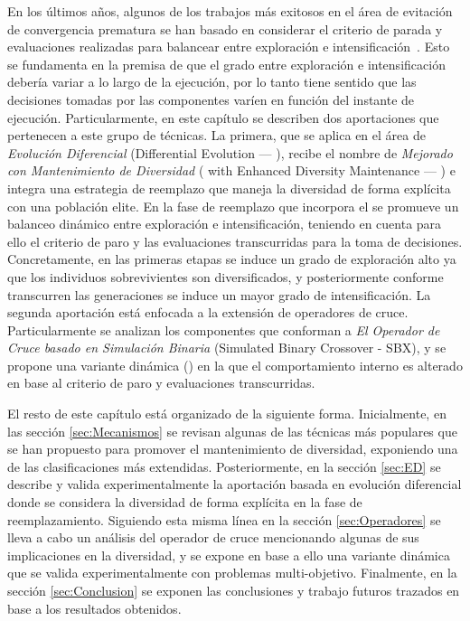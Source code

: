 En los últimos años, algunos de los trabajos más exitosos en el área de evitación de convergencia prematura se han basado en considerar el criterio de parada y evaluaciones
realizadas para balancear entre exploración e intensificación~\cite{segura2016novel}.
%
Esto se fundamenta en la premisa de que el grado entre exploración e intensificación debería variar a lo largo de la ejecución, por lo tanto tiene sentido que las decisiones tomadas por las componentes varíen en función del instante de ejecución.
%
%
Particularmente, en este capítulo se describen dos aportaciones que pertenecen a este grupo de técnicas.
%
La primera, que se aplica en el área de \textit{Evolución Diferencial} (Differential Evolution --- \DE{}), recibe el nombre de \DE{} \textit{Mejorado con Mantenimiento de Diversidad} 
(\DE{} with Enhanced Diversity Maintenance --- \DEEDM{}) e integra una estrategia de reemplazo que maneja la diversidad de forma explícita con una población elite.
%
En la fase de reemplazo que incorpora el \DEEDM{} se promueve un balanceo dinámico entre exploración e intensificación, teniendo en cuenta para ello el criterio de paro
y las evaluaciones transcurridas para la toma de decisiones.
%
Concretamente, en las primeras etapas se induce un grado de exploración alto ya que los individuos sobrevivientes son diversificados, y posteriormente conforme transcurren las 
generaciones se induce un mayor grado de intensificación.
% 
La segunda aportación está enfocada a la extensión de operadores de cruce.
%
Particularmente se analizan los componentes que conforman a \textit{El Operador de Cruce basado en Simulación Binaria} (Simulated Binary Crossover - SBX), 
y se propone una variante dinámica (\DSBX{}) en la que el comportamiento interno es alterado en base al criterio de paro y evaluaciones transcurridas.

El resto de este capítulo está organizado de la siguiente forma.
%
Inicialmente, en las sección \ref{sec:Mecanismos} se revisan algunas de las técnicas más populares que se han propuesto para promover el mantenimiento de diversidad, exponiendo una de las clasificaciones más extendidas.
%
Posteriormente, en la sección \ref{sec:ED} se describe y valida experimentalmente la aportación basada en evolución diferencial donde se considera la diversidad de forma explícita en la fase de reemplazamiento.
%
Siguiendo esta misma línea en la sección \ref{sec:Operadores} se lleva a cabo un análisis del operador de cruce \SBX{} mencionando algunas de sus implicaciones en la diversidad, 
y se expone en base a ello una variante dinámica que se valida experimentalmente con problemas multi-objetivo.
%
Finalmente, en la sección \ref{sec:Conclusion} se exponen las conclusiones y trabajo futuros trazados en base a los resultados obtenidos.
%
